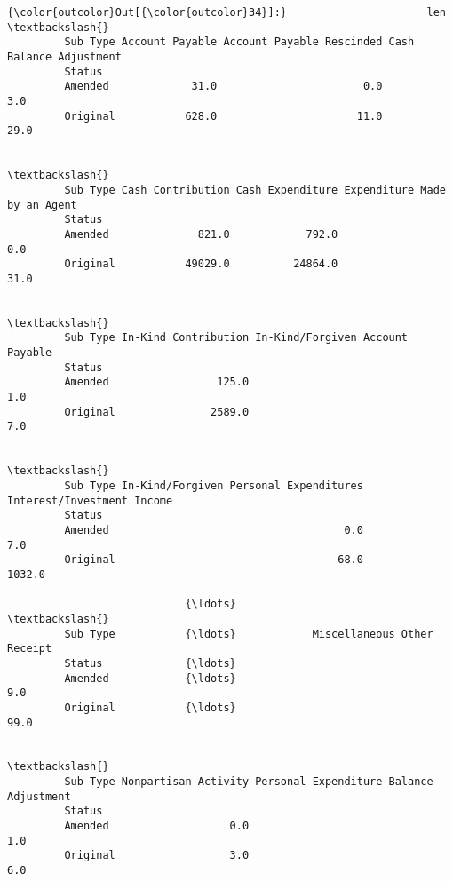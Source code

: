 \documentclass[11pt]{article}
\begin{document}
\begin{Verbatim}[commandchars=\\\{\}]
{\color{outcolor}Out[{\color{outcolor}34}]:}                      len                                                    \textbackslash{}
         Sub Type Account Payable Account Payable Rescinded Cash Balance Adjustment   
         Status                                                                       
         Amended             31.0                       0.0                     3.0   
         Original           628.0                      11.0                    29.0   
         
                                                                                   \textbackslash{}
         Sub Type Cash Contribution Cash Expenditure Expenditure Made by an Agent   
         Status                                                                     
         Amended              821.0            792.0                          0.0   
         Original           49029.0          24864.0                         31.0   
         
                                                                         \textbackslash{}
         Sub Type In-Kind Contribution In-Kind/Forgiven Account Payable   
         Status                                                           
         Amended                 125.0                              1.0   
         Original               2589.0                              7.0   
         
                                                                                     \textbackslash{}
         Sub Type In-Kind/Forgiven Personal Expenditures Interest/Investment Income   
         Status                                                                       
         Amended                                     0.0                        7.0   
         Original                                   68.0                     1032.0   
         
                            {\ldots}                                         \textbackslash{}
         Sub Type           {\ldots}            Miscellaneous Other Receipt   
         Status             {\ldots}                                          
         Amended            {\ldots}                                    9.0   
         Original           {\ldots}                                   99.0   
         
                                                                                \textbackslash{}
         Sub Type Nonpartisan Activity Personal Expenditure Balance Adjustment   
         Status                                                                  
         Amended                   0.0                                     1.0   
         Original                  3.0                                     6.0   
         

\end{Verbatim}
\end{document}
